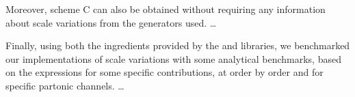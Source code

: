 Moreover, scheme C can also be obtained without requiring any information about
scale variations from the generators used.
\dots

Finally, using both the ingredients provided by the \eko and \yadism libraries,
we benchmarked our implementations of scale variations with some analytical
benchmarks, based on the expressions for some specific \dis contributions, at
order by order and for specific partonic channels.
\dots
